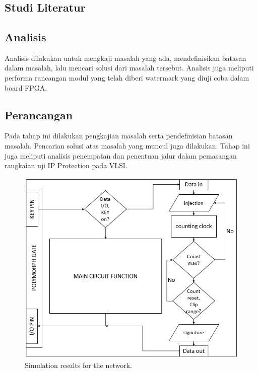 \chapter{\babTiga}


\section{Studi Literatur}

\section{Analisis}

Analisis dilakukan untuk mengkaji masalah yang ada, mendefinisikan
batasan dalam masalah, lalu mencari solusi dari masalah tersebut. Analisis juga
meliputi performa rancangan modul yang telah diberi watermark yang diuji coba
dalam board FPGA.

\section{Perancangan}

Pada tahap ini dilakukan pengkajian masalah serta pendefinisian batasan
masalah. Pencarian solusi atas masalah yang muncul juga dilakukan. Tahap ini
juga meliputi analisis penempatan dan penentuan jalur dalam pemasangan
rangkaian uji IP Protection pada VLSI.

\begin{figure}[!h]
	\centering
	\includegraphics[scale=0.6]{images/flow}
	\caption{Simulation results for the network.}
	\label{fig_sim}
\end{figure}

